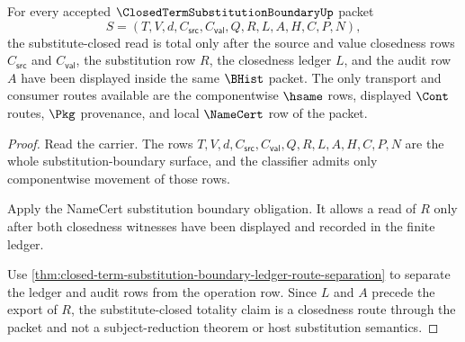 \begin{theorem}
\label{thm:closed-term-substitution-boundary-substitute-closed-totality}
For every accepted $\ClosedTermSubstitutionBoundaryUp$ packet
$$
S=(T,V,d,C_{\mathsf{src}},C_{\mathsf{val}},Q,R,L,A,H,C,P,N),
$$
the substitute-closed read is total only after the source and value closedness
rows $C_{\mathsf{src}}$ and $C_{\mathsf{val}}$, the substitution row $R$, the
closedness ledger $L$, and the audit row $A$ have been displayed inside the
same $\BHist$ packet. The only transport and consumer routes available are the
componentwise $\hsame$ rows, displayed $\Cont$ routes, $\Pkg$ provenance, and
local $\NameCert$ row of the packet.
\end{theorem}
\begin{proof}
Read the carrier. The rows
$T,V,d,C_{\mathsf{src}},C_{\mathsf{val}},Q,R,L,A,H,C,P,N$ are the whole
substitution-boundary surface, and the classifier admits only componentwise
movement of those rows.

Apply the NameCert substitution boundary obligation. It allows a read of $R$
only after both closedness witnesses have been displayed and recorded in the
finite ledger.

Use \autoref{thm:closed-term-substitution-boundary-ledger-route-separation} to
separate the ledger and audit rows from the operation row. Since $L$ and $A$
precede the export of $R$, the substitute-closed totality claim is a closedness
route through the packet and not a subject-reduction theorem or host
substitution semantics.
\end{proof}

